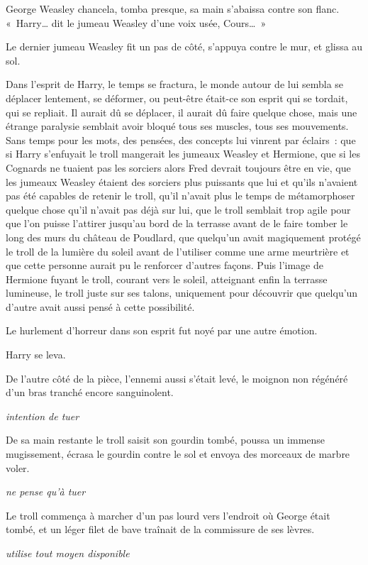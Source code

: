 George Weasley chancela, tomba presque, sa main s'abaissa contre son flanc. «~Harry… dit le jumeau Weasley d'une voix usée, Cours…~»

Le dernier jumeau Weasley fit un pas de côté, s'appuya contre le mur, et glissa au sol.

Dans l'esprit de Harry, le temps se fractura, le monde autour de lui sembla se déplacer lentement, se déformer, ou peut-être était-ce son esprit qui se tordait, qui se repliait. Il aurait dû se déplacer, il aurait dû faire quelque chose, mais une étrange paralysie semblait avoir bloqué tous ses muscles, tous ses mouvements. Sans temps pour les mots, des pensées, des concepts lui vinrent par éclairs~: que si Harry s'enfuyait le troll mangerait les jumeaux Weasley et Hermione, que si les Cognards ne tuaient pas les sorciers alors Fred devrait toujours être en vie, que les jumeaux Weasley étaient des sorciers plus puissants que lui et qu'ils n'avaient pas été capables de retenir le troll, qu'il n'avait plus le temps de métamorphoser quelque chose qu'il n'avait pas déjà sur lui, que le troll semblait trop agile pour que l'on puisse l'attirer jusqu'au bord de la terrasse avant de le faire tomber le long des murs du château de Poudlard, que quelqu'un avait magiquement protégé le troll de la lumière du soleil avant de l'utiliser comme une arme meurtrière et que cette personne aurait pu le renforcer d'autres façons. Puis l'image de Hermione fuyant le troll, courant vers le soleil, atteignant enfin la terrasse lumineuse, le troll juste sur ses talons, uniquement pour découvrir que quelqu'un d'autre avait aussi pensé à cette possibilité.

Le hurlement d'horreur dans son esprit fut noyé par une autre émotion.

Harry se leva.

De l'autre côté de la pièce, l'ennemi aussi s'était levé, le moignon non régénéré d'un bras tranché encore sanguinolent.

\emph{intention de tuer}

De sa main restante le troll saisit son gourdin tombé, poussa un immense mugissement, écrasa le gourdin contre le sol et envoya des morceaux de marbre voler.

\emph{ne pense qu'à tuer}

Le troll commença à marcher d'un pas lourd vers l'endroit où George était tombé, et un léger filet de bave traînait de la commissure de ses lèvres.

\emph{utilise tout moyen disponible}

